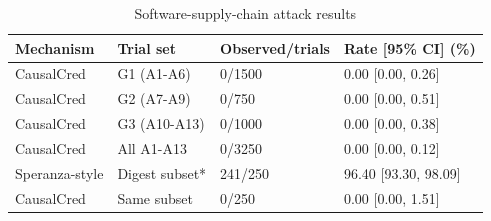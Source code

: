 \begin{table}[t]
\centering
\caption{Software-supply-chain attack results}
\begin{tabular}{llll}
\hline
Mechanism & Trial set & Observed/trials & Rate [95\% CI] (\%) \\
\hline
CausalCred & G1 (A1-A6) & 0/1500 & 0.00 [0.00, 0.26] \\
CausalCred & G2 (A7-A9) & 0/750 & 0.00 [0.00, 0.51] \\
CausalCred & G3 (A10-A13) & 0/1000 & 0.00 [0.00, 0.38] \\
CausalCred & All A1-A13 & 0/3250 & 0.00 [0.00, 0.12] \\
Speranza-style & Digest subset* & 241/250 & 96.40 [93.30, 98.09] \\
CausalCred & Same subset & 0/250 & 0.00 [0.00, 1.51] \\
\hline
\end{tabular}
\end{table}
